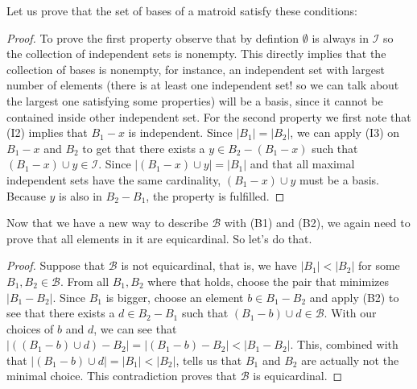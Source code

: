 Let us prove that the set of bases of a matroid satisfy these conditions:
\begin{proof}
    To prove the first property observe that by defintion $\emptyset$ is always in $\mathcal{I}$ so the collection of independent sets is nonempty. This directly implies that the collection of bases is nonempty, for instance, an independent set with largest number of elements (there is at least one independent set! so we can talk about the largest one satisfying some properties) will be a basis, since it cannot be contained inside other independent set.
    For the second property we first note that (I2) implies that $B_1 - x$ is independent. Since $|B_1|=|B_2|$, we can apply (I3) on $B_1-x$ and $B_2$ to get that there exists a $y\in B_2-(B_1-x)$ such that $(B_1-x)\cup y \in\mathcal{I}$. Since $|(B_1-x)\cup y|=|B_1|$ and that all maximal independent sets have the same cardinality, $(B_1-x)\cup y$ must be a basis. Because $y$ is also in $B_2-B_1$, the property is fulfilled.    
\end{proof}
Now that we have a new way to describe $\mathcal{B}$ with (B1) and (B2), we again need to prove that all elements in it are equicardinal. So let's do that.
\begin{proof}
    Suppose that $\mathcal{B}$ is not equicardinal, that is, we have $|B_1|<|B_2|$ for some $B_1,B_2\in\mathcal{B}$. From all $B_1,B_2$ where that holds, choose the pair that minimizes $|B_1-B_2|$. Since $B_1$ is bigger, choose an element $b\in B_1-B_2$ and apply (B2) to see that there exists a $d\in B_2-B_1$ such that $(B_1-b)\cup d \in\mathcal{B}$. With our choices of $b$ and $d$, we can see that $|((B_1-b)\cup d)-B_2|=|(B_1-b)-B_2|<|B_1-B_2|$. This, combined with that $|(B_1-b)\cup d|=|B_1|<|B_2|$, tells us that $B_1$ and $B_2$ are actually not the minimal choice. This contradiction proves that $\mathcal{B}$ is equicardinal.
\end{proof}

